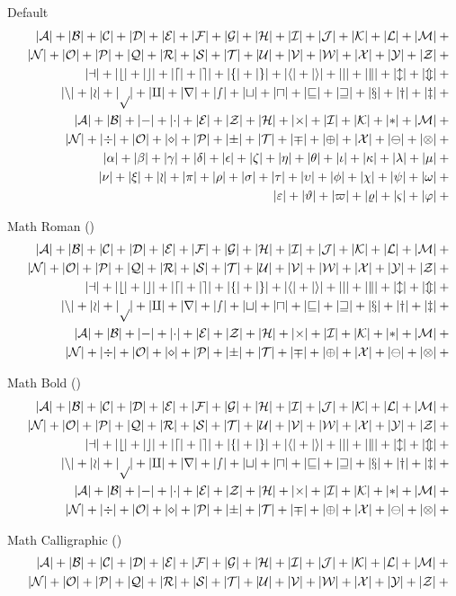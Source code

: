 \documentclass[12pt, a4paper, oneside]{article}
\theoremstyle{Plain}
\theoremstyle{Definition}
\theoremstyle{Remark}
\begin{document}
\begin{appendix}
Default
\def\test#1{|#1|+{}}
\begin{eqnarray*}
  && {\testupperi}\\
  && {\testupperii}\\
  && {\testloweri}\\
  && {\testlowerii}\\
  && {\testupgreeki}\\
  && {\testupgreekii}\\
  && {\testlowgreeki}\\
  && {\testlowgreekii}\\
  && {\testlowgreekiii}
\end{eqnarray*}%

Math Roman (\texttt{\string\mathrm})
\def\test#1{|\mathrm{#1}|+{}}%
\begin{eqnarray*}
  && {\testupperi}\\
  && {\testupperii}\\
  && {\testloweri}\\
  && {\testlowerii}\\
  && {\testupgreeki}\\
  && {\testupgreekii}
\end{eqnarray*}%


Math Bold (\texttt{\string\mathbf})
\def\test#1{|\mathbf{#1}|+{}}%
\begin{eqnarray*}
  && {\testupperi}\\
  && {\testupperii}\\
  && {\testloweri}\\
  && {\testlowerii}\\
  && {\testupgreeki}\\
  && {\testupgreekii}
\end{eqnarray*}%

Math Calligraphic (\texttt{\string\mathcal})
\def\test#1{|\mathcal{#1}|+{}}%
\begin{eqnarray*}
  && {\testupperi}\\
  && {\testupperii}
\end{eqnarray*}%



\end{appendix}
\end{document}
